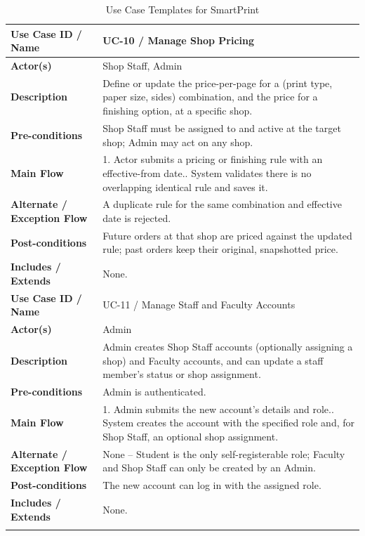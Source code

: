 \documentclass[12pt,a4paper]{report}
\begin{document}
\begin{center}
\begin{longtable}{|p{3.3cm}|p{10.7cm}|}
\textbf{Use Case ID / Name} & UC-10 / Manage Shop Pricing \\ \hline
\textbf{Actor(s)} & Shop Staff, Admin \\ \hline
\textbf{Description} & Define or update the price-per-page for a (print type, paper size, sides) combination, and the price for a finishing option, at a specific shop. \\ \hline
\textbf{Pre-conditions} & Shop Staff must be assigned to and active at the target shop; Admin may act on any shop. \\ \hline
\textbf{Main Flow} & 1. Actor submits a pricing or finishing rule with an effective-from date.\newline 2. System validates there is no overlapping identical rule and saves it. \\ \hline
\textbf{Alternate / Exception Flow} & A duplicate rule for the same combination and effective date is rejected. \\ \hline
\textbf{Post-conditions} & Future orders at that shop are priced against the updated rule; past orders keep their original, snapshotted price. \\ \hline
\textbf{Includes / Extends} & None. \\ \hline

\textbf{Use Case ID / Name} & UC-11 / Manage Staff and Faculty Accounts \\ \hline
\textbf{Actor(s)} & Admin \\ \hline
\textbf{Description} & Admin creates Shop Staff accounts (optionally assigning a shop) and Faculty accounts, and can update a staff member's status or shop assignment. \\ \hline
\textbf{Pre-conditions} & Admin is authenticated. \\ \hline
\textbf{Main Flow} & 1. Admin submits the new account's details and role.\newline 2. System creates the account with the specified role and, for Shop Staff, an optional shop assignment. \\ \hline
\textbf{Alternate / Exception Flow} & None -- Student is the only self-registerable role; Faculty and Shop Staff can only be created by an Admin. \\ \hline
\textbf{Post-conditions} & The new account can log in with the assigned role. \\ \hline
\textbf{Includes / Extends} & None. \\ \hline
\caption{Use Case Templates for SmartPrint}
\end{longtable}
\end{center}
\end{document}
